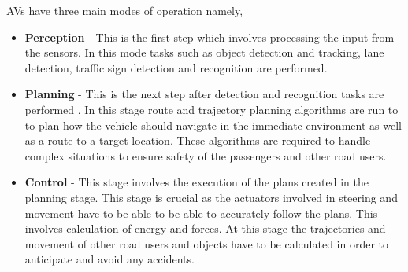 AVs have three main modes of operation namely,
\begin{itemize}
	\item \textbf{Perception} - This is the first step which involves processing the input from the sensors. In this mode tasks such as object detection and tracking, lane detection, traffic sign detection and recognition are performed.
	\item \textbf{Planning} - This is the next step after detection and recognition tasks are performed . In this stage route and trajectory planning algorithms are run to to plan how the vehicle should navigate in the immediate environment as well as a route to a target location. These algorithms are required to handle complex situations to ensure safety of the passengers and other road users. 
	\item \textbf{Control} - This stage involves the execution of the plans created in the planning stage. This stage is crucial as the actuators involved in steering and movement have to be able to be able to accurately follow the plans. This involves calculation of energy and forces. At this stage the trajectories and movement of other road users and objects have to be calculated in order to anticipate and avoid any accidents. 
	
\end{itemize}




